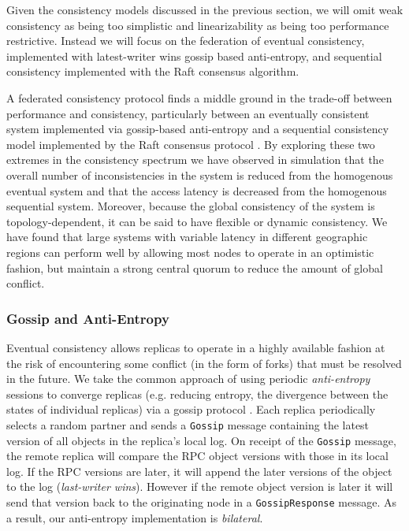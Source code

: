 \documentclass{article}
\begin{document}
Given the consistency models discussed in the previous section, we will omit weak consistency as being too simplistic and linearizability as being too performance restrictive. Instead we will focus on the federation of eventual consistency, implemented with latest-writer wins gossip based anti-entropy, and sequential consistency implemented with the Raft consensus algorithm.

A federated consistency protocol finds a middle ground in the trade-off between performance and consistency, particularly between an eventually consistent system implemented via gossip-based anti-entropy \cite{kempe_gossip-based_2003} and a sequential consistency model implemented by the Raft consensus protocol \cite{ongaro_search_2014}. By exploring these two extremes in the consistency spectrum we have observed in simulation that the overall number of inconsistencies in the system is reduced from the homogenous eventual system and that the access latency is decreased from the homogenous sequential system. Moreover, because the global consistency of the system is topology-dependent, it can be said to have flexible or dynamic consistency. We have found that large systems with variable latency in different geographic regions can perform well by allowing most nodes to operate in an optimistic fashion, but maintain a strong central quorum to reduce the amount of global conflict.

\subsubsection{Gossip and Anti-Entropy}

Eventual consistency allows replicas to operate in a highly available fashion at the risk of encountering some conflict (in the form of forks) that must be resolved in the future. We take the common approach of using periodic \textit{anti-entropy} sessions to converge replicas (e.g. reducing entropy, the divergence between the states of individual replicas) via a gossip protocol \cite{kempe_gossip-based_2003}. Each replica periodically selects a random partner and sends a \texttt{Gossip} message containing the latest version of all objects in the replica's local log. On receipt of the \texttt{Gossip} message, the remote replica will compare the RPC object versions with those in its local log. If the RPC versions are later, it will append the later versions of the object to the log (\textit{last-writer wins}). However if the remote object version is later it will send that version back to the originating node in a \texttt{GossipResponse} message. As a result, our anti-entropy implementation is \textit{bilateral}.
\end{document}
